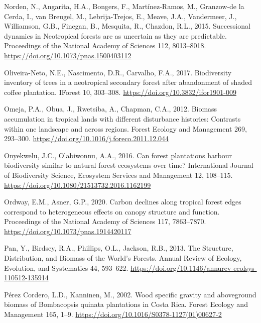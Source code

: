 \documentclass[
  12pt,
]{article}
\newlength{\cslhangindent}
\newlength{\cslentryspacingunit} %
\newenvironment{CSLReferences}[2] %
 {%
  \setlength{\parindent}{0pt}
  \ifodd #1
  \let\oldpar\par
  \def\par{\hangindent=\cslhangindent\oldpar}
  \fi
  \setlength{\parskip}{#2\cslentryspacingunit}
 }%
 {}
\begin{document}
\begin{CSLReferences}{1}{0}
\leavevmode{}%
Norden, N., Angarita, H.A., Bongers, F., Martínez-Ramos, M., Granzow-de la Cerda, I., van Breugel, M., Lebrija-Trejos, E., Meave, J.A., Vandermeer, J., Williamson, G.B., Finegan, B., Mesquita, R., Chazdon, R.L., 2015. Successional dynamics in {Neotropical} forests are as uncertain as they are predictable. Proceedings of the National Academy of Sciences 112, 8013--8018. \url{https://doi.org/10.1073/pnas.1500403112}

\leavevmode{}%
Oliveira-Neto, N.E., Nascimento, D.R., Carvalho, F.A., 2017. Biodiversity inventory of trees in a neotropical secondary forest after abandonment of shaded coffee plantation. IForest 10, 303--308. \url{https://doi.org/10.3832/ifor1901-009}

\leavevmode{}%
Omeja, P.A., Obua, J., Rwetsiba, A., Chapman, C.A., 2012. Biomass accumulation in tropical lands with different disturbance histories: {Contrasts} within one landscape and across regions. Forest Ecology and Management 269, 293--300. \url{https://doi.org/10.1016/j.foreco.2011.12.044}

\leavevmode{}%
Onyekwelu, J.C., Olabiwonnu, A.A., 2016. Can forest plantations harbour biodiversity similar to natural forest ecosystems over time? International Journal of Biodiversity Science, Ecosystem Services and Management 12, 108--115. \url{https://doi.org/10.1080/21513732.2016.1162199}

\leavevmode{}%
Ordway, E.M., Asner, G.P., 2020. Carbon declines along tropical forest edges correspond to heterogeneous effects on canopy structure and function. Proceedings of the National Academy of Sciences 117, 7863--7870. \url{https://doi.org/10.1073/pnas.1914420117}

\leavevmode{}%
Pan, Y., Birdsey, R.A., Phillips, O.L., Jackson, R.B., 2013. The {Structure}, {Distribution}, and {Biomass} of the {World}'s {Forests}. Annual Review of Ecology, Evolution, and Systematics 44, 593--622. \url{https://doi.org/10.1146/annurev-ecolsys-110512-135914}

\leavevmode{}%
Pérez Cordero, L.D., Kanninen, M., 2002. Wood specific gravity and aboveground biomass of {Bombacopsis} quinata plantations in {Costa Rica}. Forest Ecology and Management 165, 1--9. \url{https://doi.org/10.1016/S0378-1127(01)00627-2}


\end{CSLReferences}
\end{document}
